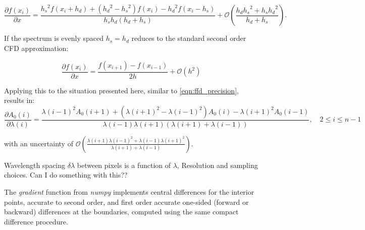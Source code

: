 {\[\frac{\partial{f(x_i)}}{\partial{x}} = \frac{{h_{s}}^{2}f\left(x_{i} + {h_{d}}\right) + \left({h_{d}}^{2} - {h_{s}}^{2}\right)f\left(x_{i}\right) - {h_{d}}^{2}f\left(x_{i}-{h_{s}}\right)} {{h_{s}}{h_{d}}\left({h_{d}} + {h_{s}}\right)} + \mathcal{O}\left(\frac{h_{d}{h_{s}}^{2} + {h_{s}}{h_{d}}^{2}}{{h_{d}} + {h_{s}}}\right) \label{full_compact_difference}.\]

If the spectrum is evenly spaced ${h_{s}}={h_{d}}$  reduces to the standard second order {CFD} approximation:

\[\frac{\partial{f(x_i)}}{\partial{x}} = \frac{f\left(x_{i+1}\right) - f\left(x_{i-1}\right)}{2h} + \mathcal{O}\left({h}^{2}\right)\]


Applying this to the situation presented here, similar to \cref{eqn:ffd_precision}, results in:
\[\frac{\partial A_0(i)}{\partial\lambda(i)} = \frac{{\lambda(i-1)}^{2} A_0(i+1) + ({\lambda(i+1)}^{2}-{\lambda(i-1)}^{2}) A_0(i) - {\lambda(i+1)}^{2} A_0(i-1)} {\lambda(i-1)\lambda(i+1)(\lambda(i+1) + \lambda(i-1))}, \hspace{1em} 2 \leq i \leq n-1\]

with an uncertainty of \(\mathcal{O}\left(\frac{\lambda(i+1){\lambda(i-1)}^{2} + \lambda(i-1){\lambda(i+1)}^{2}}{\lambda(i+1) + \lambda(i-1)}\right)\).


{\red{} Wavelength spacing \(\delta\lambda\) between pixels is a function of \(\lambda\), Resolution and sampling choices.
Can I do something with this??}

The \emph{gradient} function from \emph{numpy} implements central differences for the interior points, accurate to second order, and first order accurate one-sided (forward or backward) differences at the boundaries, computed using the same compact difference procedure.

}
